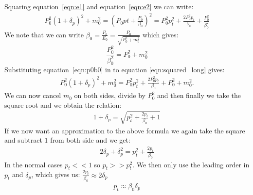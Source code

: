 Squaring equation~\ref{eqn:e1} and equation~\ref{eqn:e2} we can write:
\begin{eqnarray}
 P_0^2(1+\delta _p)^2+m_0^2 =  (P_0pt + \frac{P_0}{\beta _0})^2 = P_0 ^2 p_t ^2 + \frac{2P_0^2 p_t}{\beta_0}+\frac{P_0^2}{\beta_0 ^2}
 \label{eqn:squared_long}
\end{eqnarray}
We note that we can write $\beta _0 = \frac{P_0}{E_0} = \frac{P_0}{\sqrt{P_0^2+m_0^2}}$ which gives: 
\begin{equation}
    \frac{P_0^2}{\beta_0^2} = P_0^2 + m_0^2
    \label{eqn:p0b0}
\end{equation}
Substituting equation~\ref{eqn:p0b0} in to equation \ref{eqn:squared_long} gives:
\begin{eqnarray}
 P_0^2(1+\delta _p)^2+m_0^2 =P_0 ^2 p_t ^2 + \frac{2P_0^2 p_t}{\beta_0}+P_0^2+m_0 ^2 .
\end{eqnarray}
We can now cancel $m_0$ on both sides, divide by $P_0^2$ and then finally we take the square root and we obtain the relation:  
\begin{eqnarray}
 1+\delta _p =\sqrt{p_t ^2 + \frac{2p_t}{\beta_0}+1} 
\end{eqnarray}
If we now want an approximation to the above formula we again take the square and subtract 1 from both side and we get:
\begin{eqnarray}
 2\delta _p+\delta _p^2 =p_t ^2 + \frac{2p_t}{\beta_0} 
\end{eqnarray}
In the normal cases $p_t << 1$ so $p_t >> p_t ^2$.  We then only use the leading order in $p_t$ and $\delta _p$, which gives us:  $\frac{2p_t}{\beta_0} \approx  2 \delta _p$   
\begin{eqnarray}
p_t \approx  \beta_0 \delta _p  
\end{eqnarray}